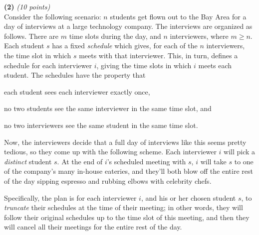\documentclass[12pt]{article}
\begin{document}
\setlength{\parindent}{0in}
\addtolength{\parskip}{0.1cm}
\setlength{\fboxrule}{.5mm}\setlength{\fboxsep}{1.2mm}
\newlength{\boxlength}\setlength{\boxlength}{\textwidth}
\addtolength{\boxlength}{-4mm}
\begin{center}
\end{center}
\vspace{5mm}

{\bf (2)} {\em (10 points)} \\
Consider the following scenario:
$n$ students get flown out to the Bay Area
for a day of interviews at a large technology company.
The interviews are organized as follows.
There are $m$ time slots during the day, and $n$ interviewers,
where $m \ge n$.
Each student $s$ has a fixed {\em schedule} which gives, for each of the
$n$ interviewers, the time slot in which $s$ meets with that interviewer.
This, in turn, defines a schedule for each interviewer $i$,
giving the time slots in which $i$ meets each student.
The schedules have the property that
\begin{compactitem}
\item each student sees each interviewer exactly once,
\item no two students see the same interviewer in the same time slot, and
\item no two interviewers see the same student in the same time slot.
\end{compactitem}

Now, the interviewers decide that a full day of interviews like this
seems pretty tedious, so they come up with the following scheme.
Each interviewer $i$ will pick a {\em distinct} student $s$.
At the end of $i$'s scheduled meeting with $s$, $i$ will take $s$
to one of the company's many in-house eateries, 
and they'll both blow off the entire rest of the day
sipping espresso and rubbing elbows with celebrity chefs.

Specifically, the plan is for each interviewer $i$,
and his or her chosen student $s$, to
{\em truncate} their schedules at the time of their meeting;
in other words, they will follow their original schedules up to the
time slot of this meeting, and then they will cancel
all their meetings for the entire rest of the day.
\end{document}
